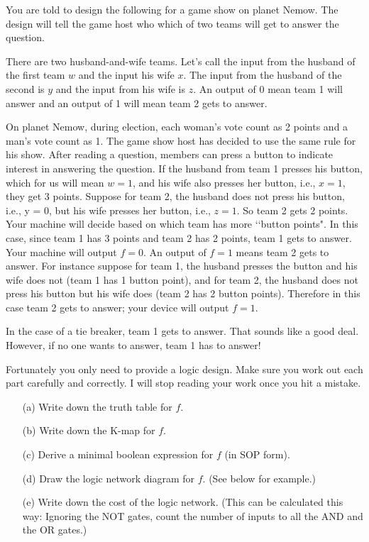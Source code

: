 \newpage
\nextq
You are told to design the following for a game show on planet Nemow.
The design will tell the game host who which of two teams will get to answer
the question.

There are two husband-and-wife teams.
Let's call the input from the husband of the first team $w$ and the input
his wife $x$.
The input from the husband of the second is $y$ and the input from his wife
is $z$.
An output of 0 mean team 1 will answer and an output of 1 will mean team 2
gets to answer.

On planet Nemow, during election, each woman's vote count as 2 points and a
man's vote count as 1.
The game show host has decided to use the same rule for his show.
After reading a question, members can press a button to indicate interest in
answering the question.
If the husband from team 1 presses his button, which for us will mean $w = 1$,
and his wife also presses her button, i.e., $x = 1$, they get 3 points.
Suppose for team 2, the husband does not press his button, i.e., y = 0,
but his wife presses her button, i.e., $z = 1$.
So team 2 gets 2 points.
Your machine will decide based on which team has more \lq\lq button points".
In this case, since team 1 has 3 points and team 2 has 2 points,
team 1 gets to answer.
Your machine will output $f = 0$.
An output of $f = 1$ means team 2 gets to answer.
For instance suppose for team 1, the husband presses the button and his wife
does not (team 1 has 1 button point), and for team 2, the husband does not
press his button but his wife does (team 2 has 2 button points).
Therefore in this case team 2 gets to answer; your device will output $f = 1$.

In the case of a tie breaker, team 1 gets to answer.
That sounds like a good deal.
However, if no one wants to answer, team 1 has to answer!

Fortunately you only need to provide a logic design.
Make sure you work out each part carefully and correctly.
I will stop reading your work once you hit a mistake.

\begin{enumerate}[nosep]
\item[(a)] Write down the truth table for $f$.
\item[(b)] Write down the K-map for $f$.
\item[(c)] Derive a minimal boolean expression for $f$ (in SOP form).
\item[(d)] Draw the logic network diagram for $f$. (See below for example.)
\item[(e)] Write down the cost of the logic network.
(This can be calculated this way: Ignoring the NOT gates,
count the number of inputs to all the AND and the OR gates.)
\end{enumerate}


